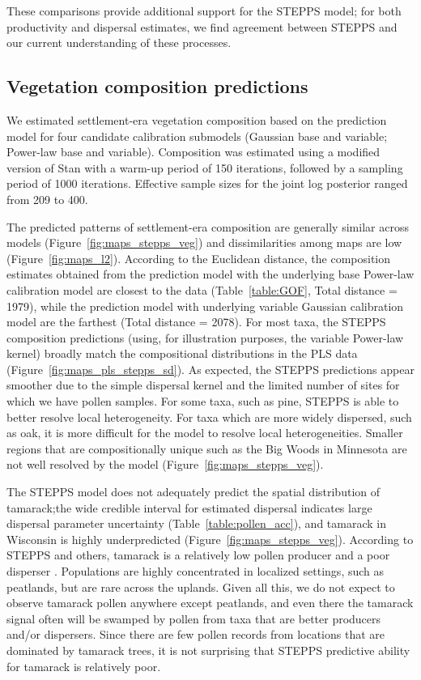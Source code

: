 \documentclass[12pt]{article}
\begin{document}
These comparisons provide additional support for the STEPPS model; for
both productivity and dispersal estimates, we find agreement between
STEPPS and our current understanding of these processes.

\subsection{Vegetation composition predictions}

We estimated settlement-era vegetation composition based on the
prediction model for four candidate calibration submodels (Gaussian
base and variable; Power-law base and variable). Composition was
estimated using a modified version of Stan with a warm-up period of
150 iterations, followed by a sampling period of 1000
iterations. Effective sample sizes for the joint log posterior ranged
from 209 to 400.

The predicted patterns of settlement-era composition are generally
similar across models (Figure~\ref{fig:maps_stepps_veg}) and
dissimilarities among maps are low
(Figure~\ref{fig:maps_l2}). According to the Euclidean distance, the
composition estimates obtained from the prediction model with the
underlying base Power-law calibration model are closest to the data
(Table~\ref{table:GOF}, Total distance = 1979), while the prediction
model with underlying variable Gaussian calibration model are the
farthest (Total distance = 2078).  For most taxa, the STEPPS
composition predictions (using, for illustration purposes, the
variable Power-law kernel) broadly match the compositional
distributions in the PLS data
(Figure~\ref{fig:maps_pls_stepps_sd}). As expected, the STEPPS
predictions appear smoother due to the simple dispersal kernel and the
limited number of sites for which we have pollen samples. For some
taxa, such as pine, STEPPS is able to better resolve local
heterogeneity. For taxa which are more widely dispersed, such as oak,
it is more difficult for the model to resolve local
heterogeneities. Smaller regions that are compositionally unique such
as the Big Woods in Minnesota are not well resolved by the model
(Figure~\ref{fig:maps_stepps_veg}).

The STEPPS model does not adequately predict the spatial distribution
of tamarack;the wide credible interval for estimated dispersal
indicates large dispersal parameter uncertainty
(Table~\ref{table:pollen_acc}), and tamarack in Wisconsin is highly
underpredicted (Figure~\ref{fig:maps_stepps_veg}). According to STEPPS
and others, tamarack is a relatively low pollen producer and a poor
disperser \citep{janssen1966recent}. Populations are highly
concentrated in localized settings, such as peatlands, but are rare
across the uplands. Given all this, we do not expect to observe
tamarack pollen anywhere except peatlands, and even there the tamarack
signal often will be swamped by pollen from taxa that are better
producers and/or dispersers. Since there are few pollen records from
locations that are dominated by tamarack trees, it is not surprising
that STEPPS predictive ability for tamarack is relatively poor.
\end{document}
